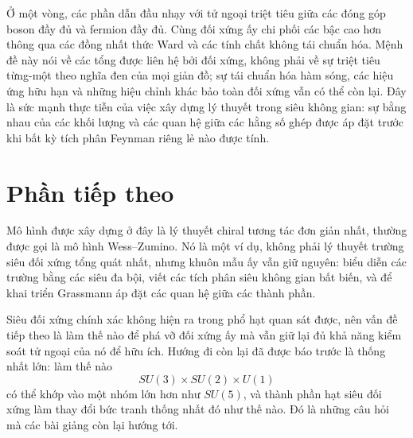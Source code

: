 Ở một vòng, các phần dẫn đầu nhạy với tử ngoại triệt tiêu giữa các đóng góp boson đầy đủ và fermion đầy đủ. Cùng đối xứng ấy chi phối các bậc cao hơn thông qua các đồng nhất thức Ward và các tính chất không tái chuẩn hóa. Mệnh đề này nói về các tổng được liên hệ bởi đối xứng, không phải về sự triệt tiêu từng-một theo nghĩa đen của mọi giản đồ; sự tái chuẩn hóa hàm sóng, các hiệu ứng hữu hạn và những hiệu chỉnh khác bảo toàn đối xứng vẫn có thể còn lại. Đây là sức mạnh thực tiễn của việc xây dựng lý thuyết trong siêu không gian: sự bằng nhau của các khối lượng và các quan hệ giữa các hằng số ghép được áp đặt trước khi bất kỳ tích phân Feynman riêng lẻ nào được tính.

\section{Phần tiếp theo}

Mô hình được xây dựng ở đây là lý thuyết chiral tương tác đơn giản nhất, thường được gọi là mô hình Wess--Zumino. Nó là một ví dụ, không phải lý thuyết trường siêu đối xứng tổng quát nhất, nhưng khuôn mẫu ấy vẫn giữ nguyên: biểu diễn các trường bằng các siêu đa bội, viết các tích phân siêu không gian bất biến, và để khai triển Grassmann áp đặt các quan hệ giữa các thành phần.

Siêu đối xứng chính xác không hiện ra trong phổ hạt quan sát được, nên vấn đề tiếp theo là làm thế nào để phá vỡ đối xứng ấy mà vẫn giữ lại đủ khả năng kiểm soát tử ngoại của nó để hữu ích. Hướng đi còn lại đã được báo trước là thống nhất lớn: làm thế nào
\begin{equation}
SU(3)\times SU(2)\times U(1)
\end{equation}
có thể khớp vào một nhóm lớn hơn như \(SU(5)\), và thành phần hạt siêu đối xứng làm thay đổi bức tranh thống nhất đó như thế nào. Đó là những câu hỏi mà các bài giảng còn lại hướng tới.
